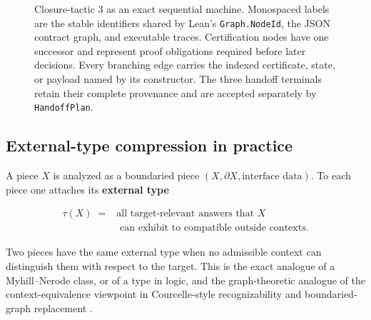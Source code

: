 \documentclass[
  11pt,
]{article}
\theoremstyle{definition}
\begin{document}
\begin{figure}[p]
{%
}
\caption[Closure-tactic 3: exact external-type machine]{Closure-tactic 3 as an exact sequential machine.  Monospaced labels are the stable identifiers shared by Lean's \texttt{Graph.NodeId}, the JSON contract graph, and executable traces.  Certification nodes have one successor and represent proof obligations required before later decisions.  Every branching edge carries the indexed certificate, state, or payload named by its constructor.  The three handoff terminals retain their complete provenance and are accepted separately by \texttt{HandoffPlan}.}
\label{fig:ct3-external-type-compression}
\end{figure}
\FloatBarrier


\subsection*{External-type compression in practice}

A piece \(X\) is analyzed as a boundaried piece
\((X,\partial X,\text{interface data})\). To each piece one attaches its
\textbf{external type}

\[
\begin{aligned}
\tau(X) \;={}& \text{all target-relevant answers that } X\\
&\text{ can exhibit to compatible outside contexts}.
\end{aligned}
\]

Two pieces have the same external type when no admissible context can
distinguish them with respect to the target. This is the exact analogue
of a Myhill--Nerode class, or of a type in logic, and the
graph-theoretic analogue of the context-equivalence viewpoint in
Courcelle-style recognizability and boundaried-graph replacement
\citep{myhill-1957-automata, nerode-1958-linear, courcelle-1990-mso-graphs, courcelle-engelfriet-2012-graph-structure, bodlaender-etal-2009-meta-kernelization}.
\end{document}
